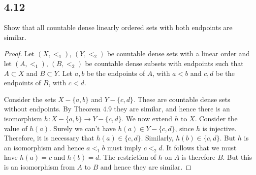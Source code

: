 \subsection*{4.12} Show that all countable dense linearly ordered sets with both endpoints are similar.

\begin{proof}
Let $(X, <_1)$, $(Y, <_2)$ be countable dense sets with a linear order and let $(A, <_1)$, $(B, <_2)$ be countable dense subsets with endpoints such that $A \subset X$ and $B \subset Y$. Let $a,b$ be the endpoints of $A$, with $a < b$ and $c,d$ be the endpoints of $B$, with $c < d$.

Consider the sets $X - \{a,b\}$ and $Y - \{c,d\}$. These are countable dense sets without endpoints. By Theorem 4.9 they are similar, and hence there is an isomorphism $h: X-\{a,b\} \rightarrow Y-\{c,d\}$. We now extend $h$ to $X$. Consider the value of $h(a)$. Surely we can't have $h(a) \in Y-\{c,d\}$, since $h$ is injective. Therefore, it is necessary that $h(a) \in \{c,d\}$. Similarly, $h(b) \in \{c,d\}$. But $h$ is an isomorphism and hence $a <_1 b$ must imply $c <_2 d$. It follows that we must have $h(a) = c$ and $h(b) = d$. The restriction of $h$ on $A$ is therefore $B$. But this is an isomorphism from $A$ to $B$ and hence they are similar.


\end{proof}

\newpage

